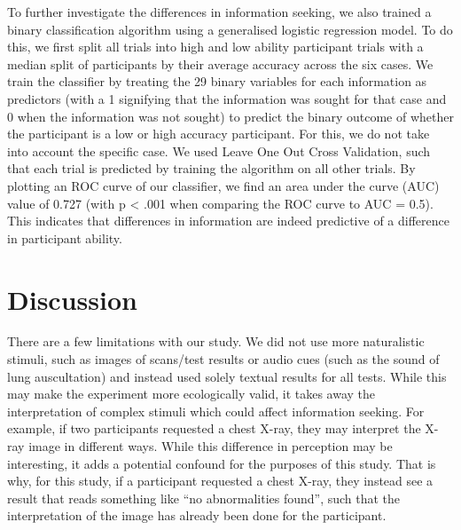 \documentclass[a4paper, nobind]{templates/ociamthesis}
\begin{document}
To further investigate the differences in information seeking, we also trained a binary classification algorithm using a generalised logistic regression model. To do this, we first split all trials into high and low ability participant trials with a median split of participants by their average accuracy across the six cases. We train the classifier by treating the 29 binary variables for each information as predictors (with a 1 signifying that the information was sought for that case and 0 when the information was not sought) to predict the binary outcome of whether the participant is a low or high accuracy participant. For this, we do not take into account the specific case. We used Leave One Out Cross Validation, such that each trial is predicted by training the algorithm on all other trials. By plotting an ROC curve of our classifier, we find an area under the curve (AUC) value of 0.727 (with p \textless{} .001 when comparing the ROC curve to AUC = 0.5). This indicates that differences in information are indeed predictive of a difference in participant ability.

\hypertarget{discussion}{%
\section*{Discussion}\label{discussion}}

There are a few limitations with our study. We did not use more naturalistic stimuli, such as images of scans/test results or audio cues (such as the sound of lung auscultation) and instead used solely textual results for all tests. While this may make the experiment more ecologically valid, it takes away the interpretation of complex stimuli which could affect information seeking. For example, if two participants requested a chest X-ray, they may interpret the X-ray image in different ways. While this difference in perception may be interesting, it adds a potential confound for the purposes of this study. That is why, for this study, if a participant requested a chest X-ray, they instead see a result that reads something like ``no abnormalities found'', such that the interpretation of the image has already been done for the participant.
\end{document}
